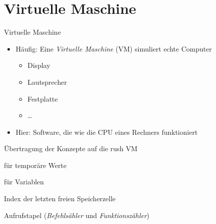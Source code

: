 \section{Virtuelle Maschine}

\begin{frame}{Virtuelle Maschine}
	\begin{itemize}
		\item<1-> Häufig: Eine \emph{Virtuelle Maschine} (VM) simuliert echte Computer
		      \begin{itemize}
			      \item<2->  Display
			      \item<3-> Lautsprecher
			      \item<4-> Festplatte
			      \item<4-> \dots
		      \end{itemize}
		\item<5-> Hier: Software, die wie die CPU eines Rechners funktioniert
	\end{itemize}
\end{frame}

\begin{frame}{Übertragung der Konzepte auf die rush VM}
	\begin{center}
		\begin{minipage}{.5\textwidth}
		\end{minipage}
	\end{center}
	\begin{description}
		\item<1->[stack] für temporäre Werte
		\item<2->[mem] für Variablen
		\item<3->[mem\_ptr] Index der letzten freien Speicherzelle
        \item<4->[call\_stack] Aufrufstapel (\emph{Befehlsähler} und \emph{Funktionszähler})
	\end{description}
\end{frame}

